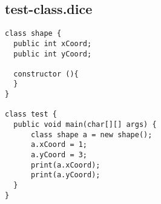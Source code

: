 \subsection{test-class.dice}
\begin{verbatim}
class shape {
  public int xCoord;
  public int yCoord;

  constructor (){
  }
}

class test {
  public void main(char[][] args) {
      class shape a = new shape(); 
      a.xCoord = 1;
      a.yCoord = 3;
      print(a.xCoord);
      print(a.yCoord);
  }
}
\end{verbatim}